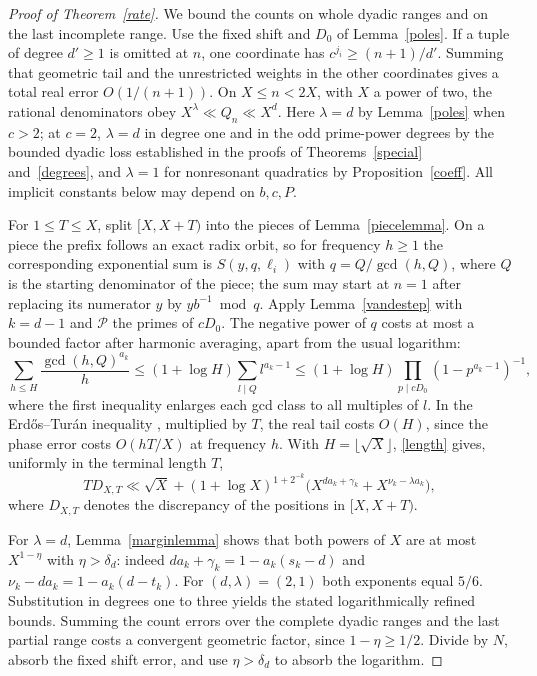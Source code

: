 \documentclass[11pt]{article}
\begin{document}
\begin{proof}[Proof of Theorem~\ref{rate}]
We bound the counts on whole dyadic ranges and on the last incomplete
range. Use the fixed shift and \(D_0\) of Lemma~\ref{poles}. If a tuple
of degree \(d'\ge1\) is omitted at \(n\), one coordinate has
\(c^{j_i}\ge(n+1)/d'\). Summing that geometric tail and the unrestricted
weights in the other coordinates gives a total real error \(O(1/(n+1))\).
On \(X\le n<2X\), with \(X\) a power of two, the rational denominators obey
\(X^\lambda\ll Q_n\ll X^d\). Here \(\lambda=d\) by Lemma~\ref{poles} when
\(c>2\); at \(c=2\), \(\lambda=d\) in degree one and in the odd prime-power
degrees by the bounded dyadic loss established in the proofs of
Theorems~\ref{special} and~\ref{degrees}, and \(\lambda=1\) for
nonresonant quadratics by Proposition~\ref{coeff}. All implicit
constants below may depend on \(b,c,P\).

For \(1\le T\le X\), split \([X,X+T)\) into the pieces of
Lemma~\ref{piecelemma}. On a piece the prefix follows an exact radix
orbit, so for frequency \(h\ge1\) the corresponding exponential sum is
\(S(y,q,\ell_i)\) with \(q=Q/\gcd(h,Q)\), where \(Q\) is the starting
denominator of the piece; the sum may start at \(n=1\) after replacing its
numerator \(y\) by \(yb^{-1}\bmod q\). Apply Lemma~\ref{vandestep} with
\(k=d-1\) and \(\mathcal P\) the primes of \(cD_0\). The negative power of
\(q\) costs at most a bounded factor after harmonic averaging, apart from
the usual logarithm:
\[
 \sum_{h\le H}\frac{\gcd(h,Q)^{a_k}}h
 \le (1+\log H)\sum_{l\mid Q}l^{a_k-1}
 \le (1+\log H)\prod_{p\mid cD_0}(1-p^{a_k-1})^{-1},
\]
where the first inequality enlarges each gcd class to all multiples of
\(l\). In the Erd\H os--Tur\'an inequality
\cite[Thm.~2.2(9), pp.~529--530]{bc}, multiplied by \(T\), the real tail
costs \(O(H)\), since the phase error costs \(O(hT/X)\) at frequency \(h\).
With \(H=\lfloor\sqrt X\rfloor\), \eqref{length} gives, uniformly in the
terminal length \(T\),
\[
 T D_{X,T}\ll \sqrt X+
 (1+\log X)^{1+2^{-k}}\bigl(X^{d a_k+\gamma_k}+X^{\nu_k-\lambda a_k}\bigr),
\]
where \(D_{X,T}\) denotes the discrepancy of the positions in \([X,X+T)\).

For \(\lambda=d\), Lemma~\ref{marginlemma} shows that both powers of \(X\)
are at most \(X^{1-\eta}\) with \(\eta>\delta_d\): indeed
\(da_k+\gamma_k=1-a_k(s_k-d)\) and \(\nu_k-da_k=1-a_k(d-t_k)\). For
\((d,\lambda)=(2,1)\) both exponents equal \(5/6\). Substitution in
degrees one to three yields the stated logarithmically refined bounds.
Summing the count errors over the complete dyadic ranges and the last
partial range costs a convergent geometric factor, since
\(1-\eta\ge1/2\). Divide by \(N\), absorb the fixed shift error, and use
\(\eta>\delta_d\) to absorb the logarithm.


\end{proof}
\end{document}
